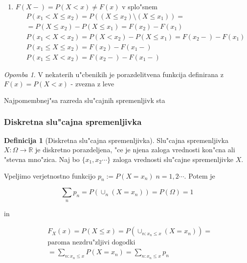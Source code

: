 \documentclass[a4paper,12pt]{article}
\theoremstyle{definition}
\newtheorem{defn}[counter]{Definicija}
\theoremstyle{remark}
\newtheorem*{rem}{Opomba}
\newcommand{\R}{\mathbb{R}}
\begin{document}
\begin{enumerate}
\begin{proof}
            \begin{align*}
                &F(x+) = \lim_{n \to \infty} F(x_n) = \lim_{n \to \infty} P(X \leq x_n) = \\
                &= P(\cap_{n=1}^{\infty} (X \leq x_n)) = P(X \leq x) = F(x)
            \end{align*}
        \end{proof}
    \item $F(X-) = P(X < x) \neq F(x)$ v splo"snem
        \begin{align*}
            &P(x_1 < X \leq x_2) = P((X \leq x_2) \text{\textbackslash} (X \leq x_1)) = \\
            &= P(X \leq x_2) - P(X \leq x_1) = F(x_2) - F(x_1) \\
            &P(x_1 < X < x_2) = P(X < x_2) - P(X \leq x_1) = F(x_2-) - F(x_1) \\
            &P(x_1 \leq X \leq x_2) = F(x_2) - F(x_1-) \\
            &P(x_1 \leq X < x_2) = F(x_2-) - F(x_1-)
        \end{align*}
\end{enumerate}

\begin{rem}
    V nekaterih u"cbenikih je porazdelitvena funkcija definirana z $F(x) = P(X < x)$ - zvezna z leve
\end{rem}

Najpomembnej"sa razreda slu"cajnih spremenljivk sta

\subsubsection{Diskretna slu"cajna spremenljivka}

\begin{defn}[Diskretna slu"cajna spremenljivka]
    Slu"cajna spremenljivka $X: \Omega \to \R$ je diskretno porazdeljena, "ce je njena zaloga vrednosti kon"cna ali
    "stevna mno"zica. Naj bo $\{x_1, x_2 \cdots\}$ zaloga vrednosti slu"cajne spremenljivke $X$.
\end{defn}

Vpeljimo verjetnostno funkcijo $p_n := P(X = x_n) \; n = 1, 2 \cdots$. Potem je

\begin{equation*}
    \sum_n p_n = P(\cup_n (X = x_n)) = P(\Omega) = 1
\end{equation*}

in

\begin{align*}
    &F_X(x) = P(X \leq x) = P(\cup_{n: x_n \leq x} (X = x_n)) = \\
    &\text{paroma nezdru"zljivi dogodki} \\
    &= \sum_{n: x_n \leq x} P(X = x_n) = \sum_{n: x_n \leq x} p_n
\end{align*}
\end{document}
